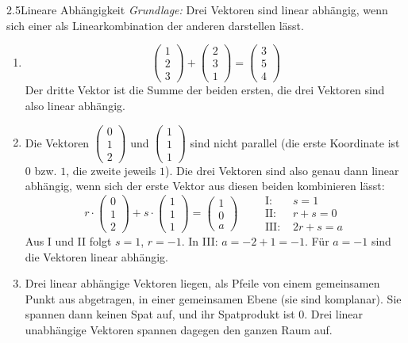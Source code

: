 
\begin{loesung}{2.5}{Lineare Abhängigkeit}
\textit{Grundlage:} Drei Vektoren sind linear abhängig, wenn sich einer als Linearkombination der anderen darstellen lässt.
\begin{enumerate}[label=\alph*)]
  \item \[\begin{pmatrix} 1\\ 2\\ 3\end{pmatrix}+\begin{pmatrix} 2\\ 3\\ 1\end{pmatrix} = \begin{pmatrix} 3\\ 5\\ 4\end{pmatrix}\]
  Der dritte Vektor ist die Summe der beiden ersten, die drei Vektoren sind also linear abhängig.
  \item Die Vektoren $\begin{pmatrix} 0\\ 1\\ 2\end{pmatrix}$ und $\begin{pmatrix} 1\\ 1\\ 1\end{pmatrix}$ sind nicht parallel (die erste Koordinate ist $0$ bzw. $1$, die zweite jeweils $1$). Die drei Vektoren sind also genau dann linear abhängig, wenn sich der erste Vektor aus diesen beiden kombinieren lässt:
  \[r\cdot\begin{pmatrix} 0\\ 1\\ 2\end{pmatrix}+s\cdot\begin{pmatrix} 1\\ 1\\ 1\end{pmatrix} = \begin{pmatrix} 1\\ 0\\ a\end{pmatrix}\qquad\begin{aligned} \text{I: }& s = 1\\ \text{II: }& r+s = 0\\ \text{III: }& 2r+s = a\end{aligned}\]
  Aus I und II folgt $s=1$, $r=-1$. In III: $a = -2+1 = -1$. Für $a=-1$ sind die Vektoren linear abhängig.
  \item Drei linear abhängige Vektoren liegen, als Pfeile von einem gemeinsamen Punkt aus abgetragen, in einer gemeinsamen Ebene (sie sind komplanar). Sie spannen dann keinen Spat auf, und ihr Spatprodukt ist $0$. Drei linear unabhängige Vektoren spannen dagegen den ganzen Raum auf.
\end{enumerate}
\end{loesung}

